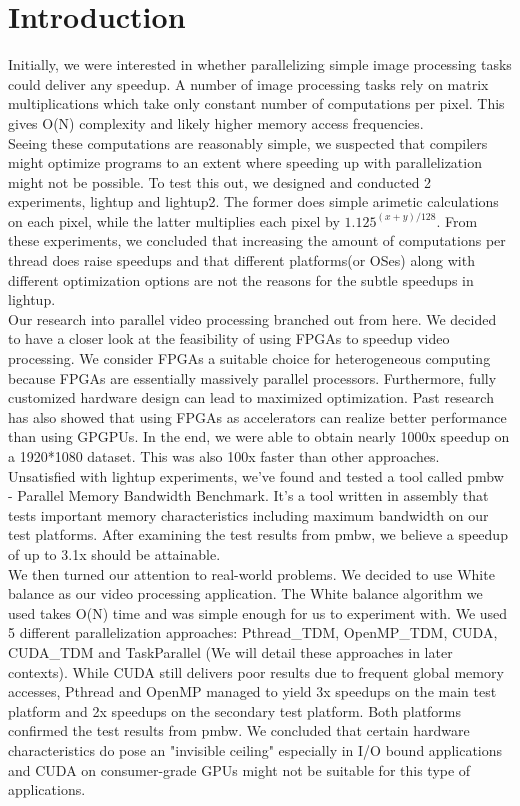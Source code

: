 \documentclass{acm_proc_article-sp}
\begin{document}
\section{Introduction}
Initially, we were interested in whether parallelizing simple image processing tasks could deliver any speedup. A number of image processing tasks rely on matrix multiplications which take only constant number of computations per pixel. This gives O(N) complexity and likely higher memory access frequencies. \\
Seeing these computations are reasonably simple, we suspected that compilers might optimize programs to an extent where speeding up with parallelization might not be possible. To test this out, we designed and conducted 2 experiments, lightup and lightup2. The former does simple arimetic calculations on each pixel, while the latter multiplies each pixel by \(1.125^{(x+y)/128}\). From these experiments, we concluded that increasing the amount of computations per thread does raise speedups and that different platforms(or OSes) along with different optimization options are not the reasons for the subtle speedups in lightup. \\
Our research into parallel video processing branched out from here. We decided to have a closer look at the feasibility of using FPGAs to speedup video processing. We consider FPGAs a suitable choice for heterogeneous computing because FPGAs are essentially massively parallel processors. Furthermore, fully customized hardware design can lead to maximized optimization. Past research has also showed that using FPGAs as accelerators can realize better performance than using GPGPUs. In the end, we were able to obtain nearly 1000x speedup on a 1920*1080 dataset. This was also 100x faster than other approaches. \\
Unsatisfied with lightup experiments, we've found and tested a tool called pmbw - Parallel Memory Bandwidth Benchmark. It's a tool written in assembly that tests important memory characteristics including maximum bandwidth on our test platforms. After examining the test results from pmbw, we believe a speedup of up to 3.1x should be attainable. \\
We then turned our attention to real-world problems. We decided to use White balance as our video processing application. The White balance algorithm we used takes O(N) time and was simple enough for us to experiment with. We used 5 different parallelization approaches: Pthread\_TDM, OpenMP\_TDM, CUDA, CUDA\_TDM and TaskParallel (We will detail these approaches in later contexts). While CUDA still delivers poor results due to frequent global memory accesses, Pthread and OpenMP managed to yield 3x speedups on the main test platform and 2x speedups on the secondary test platform. Both platforms confirmed the test results from pmbw. We concluded that certain hardware characteristics do pose an "invisible ceiling" especially in I/O bound applications and CUDA on consumer-grade GPUs might not be suitable for this type of applications.
\end{document}
